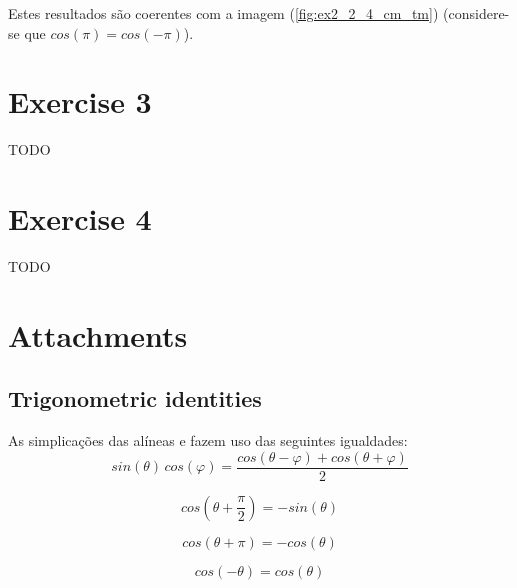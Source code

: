 \documentclass[a4paper]{article}
\begin{document}
\noindent Estes resultados são coerentes com a imagem (\ref{fig:ex2_2_4_cm_tm}) (considere-se que $cos(\pi) = cos(-\pi)$).

\section{Exercise 3}
\noindent TODO %

\section{Exercise 4}
\noindent TODO %

\section{Attachments}
\subsection{Trigonometric identities}
\label{subsec:trigident}
As simplicações das alíneas \emph{} e \emph{} fazem uso das seguintes igualdades:
\begin{equation}
sin(\theta) \, cos(\varphi) = \frac{cos(\theta - \varphi) + cos(\theta + \varphi)}{2}
\end{equation}

\begin{equation}
cos\left(\theta + \frac{\pi}{2}\right) = -sin(\theta)
\end{equation}

\begin{equation}
cos(\theta + \pi) = -cos(\theta)
\end{equation}

\begin{equation}
cos(-\theta) = cos(\theta)
\end{equation}
\end{document}
